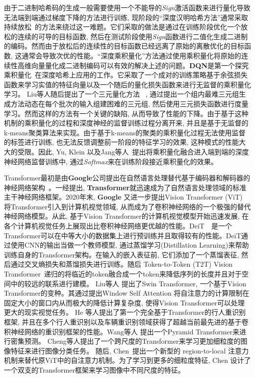 由于二进制哈希码的生成一般需要使用一个不能导的\textit{Sign}激活函数来进行量化导致无法端到端通过梯度下降的方法进行训练, 现阶段的``深度汉明哈希方法''通常采取持续放松~\cite{liu2016deep}的方法来绕过这一难题。它们采取的做法是通过在训练阶段优化一个放松的连续的可导的目标函数, 然后在测试阶段使用\textit{Sign}函数进行二值化生成二进制的编码。然而由于放松后的连续性的目标函数已经远离了原始的离散优化的目标函数, 这通常会导致次优的性能。``深度乘积量化''方法通过使用乘积量化将原始的连续性高维向量量化成二进制编码可以有效的解决上述的问题。\textbf{DQN}\cite{yue2016deep}是第一个探究乘积量化~\cite{jegou2010product,ge2013optimized,zhang2014composite}在深度哈希上应用的工作。它采取了一个成对的训练策略基于余弦损失函数来学习实值的特征向量以及一个随后的量化损失函数来进行无监督的乘积量化学习。 Liu等人随后提出了一个三元量化方法~ \cite{liu2018deep}, 通过提出一个组内最难三元组生成方法动态在每个批次的输入组建困难的三元组, 然后使用三元损失函数进行度量学习。然而这样的方法有一个关键的缺陷, 从而导致了性能的下降。由于基于这种机制的乘积量化的过程和深度神经的监督训练过程分离开来, 并且是基于无监督的k-means聚类算法来实现。由于基于k-means的聚类的乘积量化过程无法使用监督的标签进行训练, 也无法反馈调整前一阶段的特征学习的效果, 这种模式的性能大大的受限。因此, Yu, Klein 以及Jang等人~\cite{yu2018product, klein2019end,jang2020generalized}提出将乘积量化融合进入端到端的深度神经网络监督训练中, 通过\textit{Softmax}来在训练阶段接近乘积量化的效果。\par
Transformer最初是由\textbf{Google}公司提出在自然语言处理替代基于编码器和解码器的神经网络架构~\cite{vaswani2017attention}。一经提出, \textbf{Transformer}就迅速成为了自然语言处理领域的标准主干神经网络框架。2020年末, \textbf{Google} 又进一步提出Vision Transformer (ViT) 将Transformer引入到计算机视觉领域, 从而成为了卷积神经网络的一个极强的替代神经网络模型。从此, 基于Vision Transformer的计算机视觉模型开始迅速发展, 在各个计算机视觉任务上展现出比卷积神经网络更优越的性能。DeiT~\cite{touvron2021training}~是一个Transformer可以在中等大小的数据集上进行预训练并且取得较有的性能。DeiT通过使用CNN的输出当做一个教师模型, 通过蒸馏学习(Distillation Learning)来帮助训练自身的Transformer架构。在输入的嵌入表征前, 它们添加了一个蒸馏表征, 然后通过交叉熵损失和蒸馏损失进行训练。随后 Token-to-Token (T2T) Vision Transformer~\cite{yuan2021tokens}递归的将临近的token融合成一个token来降低序列的长度并且对于空间中的较远的联系进行建模。 Liu等人\cite{liu2021swin} 提出了Swin Transformer, 一个基于Vision Transformer的变种。其通过提出Window Self Attention 将自注意力的计算限制在固定大小的窗口内从而极大的降低计算复杂度, 使得Vision Transformer可以处理更大的现实视觉任务。 He 等人\cite{he2021transreid}提出了第一个完全基于Transformer的行人重识别框架, 并且在多个行人重识别以及车辆重识别领域获得了超越当前最先进的基于卷积神经网络的重识别框架的性能。Wang等人 \cite{wang2021pyramid}提出一个Pyramid Transformer来进行密集预测。 Cheng等人\cite{wang2021crossformer}提出了一个跨尺度的Transformer来学习更加细粒度的图像特征来进行图像分类任务。 随后, Chen~\cite{chen2021regionvit}提出一个新型的 region-to-local 注意力机制来替代原ViT中的自注意力机制。为了学习到更多的细粒度特征, Chen\cite{chen2021crossvit} 设计了一个双支的Transformer框架来学习图像中不同尺度的特征。\par
